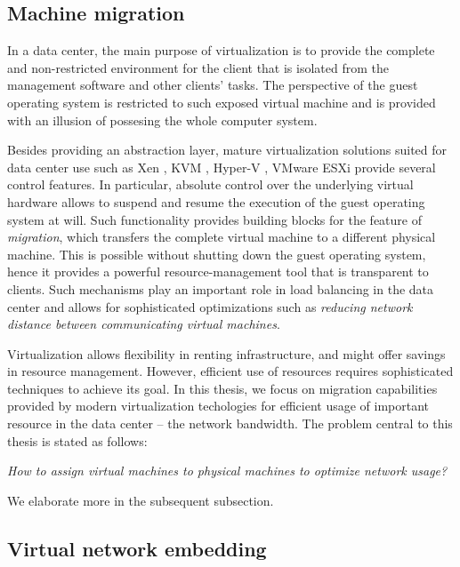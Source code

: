 \subsection{Machine migration}

In a data center, the main purpose of virtualization is to provide the complete and non-restricted environment for the client that is isolated from the management software and other clients' tasks.
The perspective of the guest operating system is restricted to such exposed virtual machine and is provided with an illusion of possesing the whole computer system.


Besides providing an abstraction layer, mature virtualization solutions suited for data center use such as Xen
\cite{url-xen}, KVM \cite{url-kvm}, Hyper-V \cite{url-hyperv}, VMware ESXi
\cite{url-vmware} provide several control features.
In particular, absolute control over the underlying virtual hardware allows to suspend and resume the execution of the guest operating system at will.
Such functionality provides building blocks for the feature of \emph{migration}, which transfers the complete virtual machine to a different physical machine.
This is possible without shutting down the guest operating system, hence it provides a powerful resource-management tool that is transparent to clients.
Such mechanisms play an important role in load balancing in the data center and allows for sophisticated optimizations such as \emph{reducing network distance between communicating virtual machines}.

Virtualization allows flexibility in renting infrastructure, and might offer savings in resource management.
However, efficient use of resources requires sophisticated techniques to achieve its goal.
In this thesis, we focus on migration capabilities provided by modern virtualization techologies for efficient usage of important resource in the data center -- the network bandwidth.
The problem central to this thesis is stated as follows:

\begin{center}
  \emph{How to assign virtual machines to physical machines to optimize network
  usage?}
\end{center}

We elaborate more in the subsequent subsection.

\subsection{Virtual network embedding}


